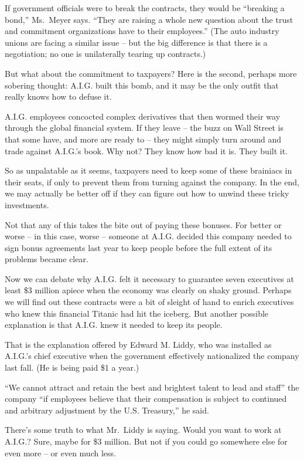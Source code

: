 \documentclass[12pt,a4paper,onecolumn]{article}
\begin{document}
\begin{CJK*}{GBK}{song}
If government officials were to break the contracts, they would be ``breaking a bond,'' Ms.~Meyer
says. ``They are raising a whole new question about the trust and commitment organizations have to
their employees.'' (The auto industry unions are facing a similar issue -- but the big difference is
that there is a negotiation; no one is unilaterally tearing up contracts.)

But what about the commitment to taxpayers? Here is the second, perhaps more sobering thought:
A.I.G. built this bomb, and it may be the only outfit that really knows how to defuse it.

A.I.G. employees concocted complex derivatives that then wormed their way through the global
financial system. If they leave -- the buzz on Wall Street is that some have, and more are ready to
-- they might simply turn around and trade against A.I.G.'s book. Why not? They know how bad it is.
They built it.

So as unpalatable as it seems, taxpayers need to keep some of these brainiacs in their seats, if
only to prevent them from turning against the company. In the end, we may actually be better off if
they can figure out how to unwind these tricky investments.

Not that any of this takes the bite out of paying these bonuses. For better or worse -- in this
case, worse -- someone at A.I.G. decided this company needed to sign bonus agreements last year to
keep people before the full extent of its problems became clear.

Now we can debate why A.I.G. felt it necessary to guarantee seven executives at least \$3 million
apiece when the economy was clearly on shaky ground. Perhaps we will find out these contracts were a
bit of sleight of hand to enrich executives who knew this financial Titanic had hit the iceberg. But
another possible explanation is that A.I.G. knew it needed to keep its people.

That is the explanation offered by Edward M. Liddy, who was installed as A.I.G.'s chief executive
when the government effectively nationalized the company last fall. (He is being paid \$1 a year.)

``We cannot attract and retain the best and brightest talent to lead and staff'' the company ``if
employees believe that their compensation is subject to continued and arbitrary adjustment by the
U.S. Treasury,'' he said.

There's some truth to what Mr.~Liddy is saying. Would you want to work at A.I.G.? Sure, maybe for
\$3 million. But not if you could go somewhere else for even more -- or even much less.


\end{CJK*}
\end{document}

